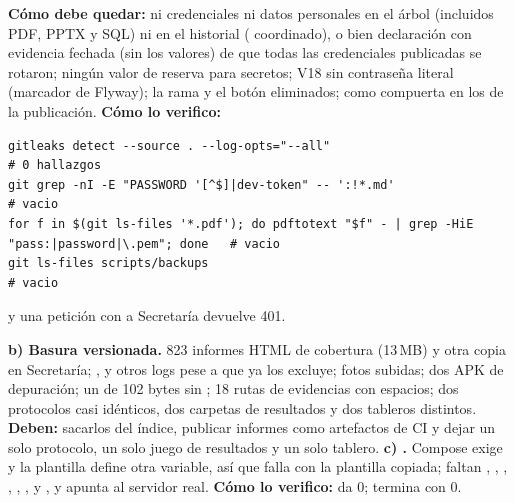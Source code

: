 \textbf{C\'omo debe quedar:} ni credenciales ni datos personales en el \'arbol (incluidos PDF, PPTX y SQL) ni en el historial ( coordinado), o bien declaraci\'on con evidencia fechada (sin los valores) de que todas las credenciales publicadas se rotaron; ning\'un valor de reserva para secretos; V18 sin contrase\~na literal (marcador de Flyway); la rama  y el bot\'on eliminados;  como compuerta en los  de la publicaci\'on. \textbf{C\'omo lo verifico:}\begin{verbatim}
gitleaks detect --source . --log-opts="--all"                                          # 0 hallazgos
git grep -nI -E "PASSWORD '[^$]|dev-token" -- ':!*.md'                                 # vacio
for f in $(git ls-files '*.pdf'); do pdftotext "$f" - | grep -HiE "pass:|password|\.pem"; done   # vacio
git ls-files scripts/backups                                                            # vacio
\end{verbatim}
y una petici\'on con  a Secretar\'ia devuelve 401.

\textbf{b) Basura versionada.} 823 informes HTML de cobertura (13\,MB) y otra copia en Secretar\'ia; ,  y otros logs pese a que  ya los excluye; fotos subidas; dos APK de depuraci\'on; un  de 102 bytes sin ; 18 rutas de evidencias con espacios; dos protocolos casi id\'enticos, dos carpetas de resultados y dos tableros distintos. \textbf{Deben:} sacarlos del \'indice, publicar informes como artefactos de CI y dejar un solo protocolo, un solo juego de resultados y un solo tablero. \textbf{c) .} Compose exige  y la plantilla define otra variable, as\'i que  falla con la plantilla copiada; faltan , , , , , ,  y , y  apunta al servidor real. \textbf{C\'omo lo verifico:}  da 0;  termina con 0.

